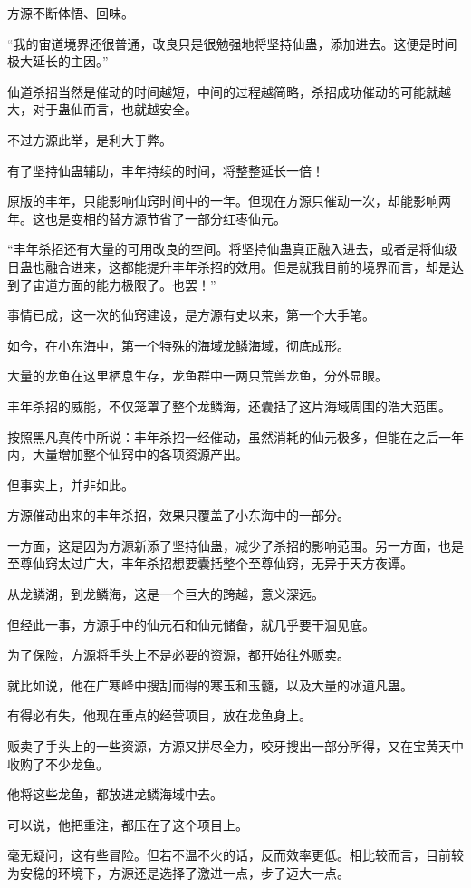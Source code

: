 \begin{this_body}
方源不断体悟、回味。

“我的宙道境界还很普通，改良只是很勉强地将坚持仙蛊，添加进去。这便是时间极大延长的主因。”

仙道杀招当然是催动的时间越短，中间的过程越简略，杀招成功催动的可能就越大，对于蛊仙而言，也就越安全。

不过方源此举，是利大于弊。

有了坚持仙蛊辅助，丰年持续的时间，将整整延长一倍！

原版的丰年，只能影响仙窍时间中的一年。但现在方源只催动一次，却能影响两年。这也是变相的替方源节省了一部分红枣仙元。

“丰年杀招还有大量的可用改良的空间。将坚持仙蛊真正融入进去，或者是将仙级日蛊也融合进来，这都能提升丰年杀招的效用。但是就我目前的境界而言，却是达到了宙道方面的能力极限了。也罢！”

事情已成，这一次的仙窍建设，是方源有史以来，第一个大手笔。

如今，在小东海中，第一个特殊的海域龙鳞海域，彻底成形。

大量的龙鱼在这里栖息生存，龙鱼群中一两只荒兽龙鱼，分外显眼。

丰年杀招的威能，不仅笼罩了整个龙鳞海，还囊括了这片海域周围的浩大范围。

按照黑凡真传中所说：丰年杀招一经催动，虽然消耗的仙元极多，但能在之后一年内，大量增加整个仙窍中的各项资源产出。

但事实上，并非如此。

方源催动出来的丰年杀招，效果只覆盖了小东海中的一部分。

一方面，这是因为方源新添了坚持仙蛊，减少了杀招的影响范围。另一方面，也是至尊仙窍太过广大，丰年杀招想要囊括整个至尊仙窍，无异于天方夜谭。

从龙鳞湖，到龙鳞海，这是一个巨大的跨越，意义深远。

但经此一事，方源手中的仙元石和仙元储备，就几乎要干涸见底。

为了保险，方源将手头上不是必要的资源，都开始往外贩卖。

就比如说，他在广寒峰中搜刮而得的寒玉和玉髓，以及大量的冰道凡蛊。

有得必有失，他现在重点的经营项目，放在龙鱼身上。

贩卖了手头上的一些资源，方源又拼尽全力，咬牙搜出一部分所得，又在宝黄天中收购了不少龙鱼。

他将这些龙鱼，都放进龙鳞海域中去。

可以说，他把重注，都压在了这个项目上。

毫无疑问，这有些冒险。但若不温不火的话，反而效率更低。相比较而言，目前较为安稳的环境下，方源还是选择了激进一点，步子迈大一点。


\end{this_body}
